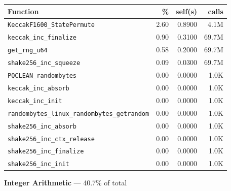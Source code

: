 \documentclass[11pt,a4paper]{article}
\begin{document}
\begin{longtable}{p{7.5cm}rrr}
\toprule
Function & \% & self(s) & calls \\
\midrule
\endhead
  \texttt{KeccakF1600\_StatePermute} & 2.60 & 0.8900 & 4.1M \\
  \texttt{keccak\_inc\_finalize} & 0.90 & 0.3100 & 69.7M \\
  \texttt{get\_rng\_u64} & 0.58 & 0.2000 & 69.7M \\
  \texttt{shake256\_inc\_squeeze} & 0.09 & 0.0300 & 69.7M \\
  \texttt{PQCLEAN\_randombytes} & 0.00 & 0.0000 & 1.0K \\
  \texttt{keccak\_inc\_absorb} & 0.00 & 0.0000 & 1.0K \\
  \texttt{keccak\_inc\_init} & 0.00 & 0.0000 & 1.0K \\
  \texttt{randombytes\_linux\_randombytes\_getrandom} & 0.00 & 0.0000 & 1.0K \\
  \texttt{shake256\_inc\_absorb} & 0.00 & 0.0000 & 1.0K \\
  \texttt{shake256\_inc\_ctx\_release} & 0.00 & 0.0000 & 1.0K \\
  \texttt{shake256\_inc\_finalize} & 0.00 & 0.0000 & 1.0K \\
  \texttt{shake256\_inc\_init} & 0.00 & 0.0000 & 1.0K \\
\bottomrule
\end{longtable}

\noindent\colorbox{intcolor}{\strut \textbf{Integer Arithmetic} --- 40.7\% of total}
\vspace{2pt}
\end{document}
